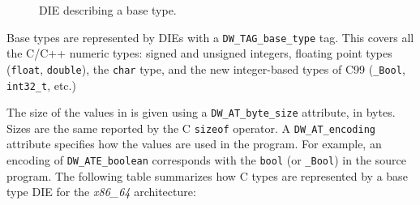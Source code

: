 
\begin{figure}
  \centering
  \caption{DIE describing a base type.}
  \label{fig:die-base-type}
\end{figure}


Base types are represented by DIEs with a \verb|DW_TAG_base_type| tag. This
covers all the C/C++ numeric types: signed and unsigned integers, floating
point types (\texttt{float}, \texttt{double}), the
\texttt{char} type, and the new integer-based types of C99
(\texttt{_Bool}, \texttt{int32_t}, etc.)

The size of the values in is given using a \verb|DW_AT_byte_size| attribute,
in bytes. Sizes are the same reported by the C \texttt{sizeof}
operator. A \verb|DW_AT_encoding| attribute specifies how the values are
used in the program. For example, an encoding of \verb|DW_ATE_boolean|
corresponds with the \texttt{bool} (or \texttt{_Bool}) in the
source program. The following table summarizes how C types are represented by
a base type DIE for the \textit{x86\_64} architecture:

